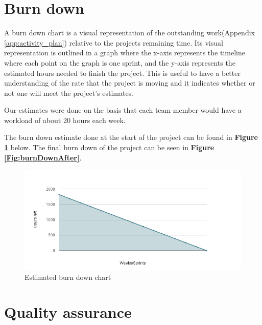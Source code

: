 \section{Burn down}


A burn down chart is a visual representation of the outstanding work(Appendix \ref{app:activity_plan}) relative to the projects remaining time. Its visual representation is outlined in a graph where the x-axis represents the timeline where each point on the graph is one sprint, and the y-axis represents the estimated hours needed to finish the project. This is useful to have a better understanding of the rate that the project is moving and it indicates whether or not one will meet the project's estimates.\newline

Our estimates were done on the basis that each team member would have a workload of about 20 hours each week. 


The burn down estimate done at the start of the project can be found in \textbf{Figure \ref{Fig:burndownstart}} below. The final burn down of the project can be seen in \textbf {Figure \ref{Fig:burnDownAfter}}.



\begin{figure}[h!]
	\centering
	\includegraphics[width=\textwidth]{fig/burndownstart}
	\caption{Estimated burn down chart}
	\label{Fig:burndownstart}
\end{figure}


\section{Quality assurance}

